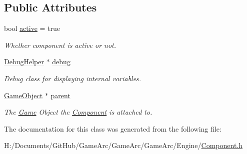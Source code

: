 \subsection*{Public Attributes}
\begin{DoxyCompactItemize}
\item 
\hypertarget{class_component_a2ebc869395d66425690dfeae99d1b791}{bool \hyperlink{class_component_a2ebc869395d66425690dfeae99d1b791}{active} = true}\label{class_component_a2ebc869395d66425690dfeae99d1b791}

\begin{DoxyCompactList}\small\item\em Whether component is active or not. \end{DoxyCompactList}\item 
\hypertarget{class_component_a34ff24093894370eb2e25e0bc2833348}{\hyperlink{class_debug_helper}{Debug\+Helper} $\ast$ \hyperlink{class_component_a34ff24093894370eb2e25e0bc2833348}{debug}}\label{class_component_a34ff24093894370eb2e25e0bc2833348}

\begin{DoxyCompactList}\small\item\em Debug class for displaying internal variables. \end{DoxyCompactList}\item 
\hypertarget{class_component_a2b66804cabef14a2884c2d35f71a24ea}{\hyperlink{class_game_object}{Game\+Object} $\ast$ \hyperlink{class_component_a2b66804cabef14a2884c2d35f71a24ea}{parent}}\label{class_component_a2b66804cabef14a2884c2d35f71a24ea}

\begin{DoxyCompactList}\small\item\em The \hyperlink{class_game}{Game} Object the \hyperlink{class_component}{Component} is attached to. \end{DoxyCompactList}\end{DoxyCompactItemize}


The documentation for this class was generated from the following file\+:\begin{DoxyCompactItemize}
\item 
H\+:/\+Documents/\+Git\+Hub/\+Game\+Arc/\+Game\+Arc/\+Game\+Arc/\+Engine/\hyperlink{_component_8h}{Component.\+h}\end{DoxyCompactItemize}
